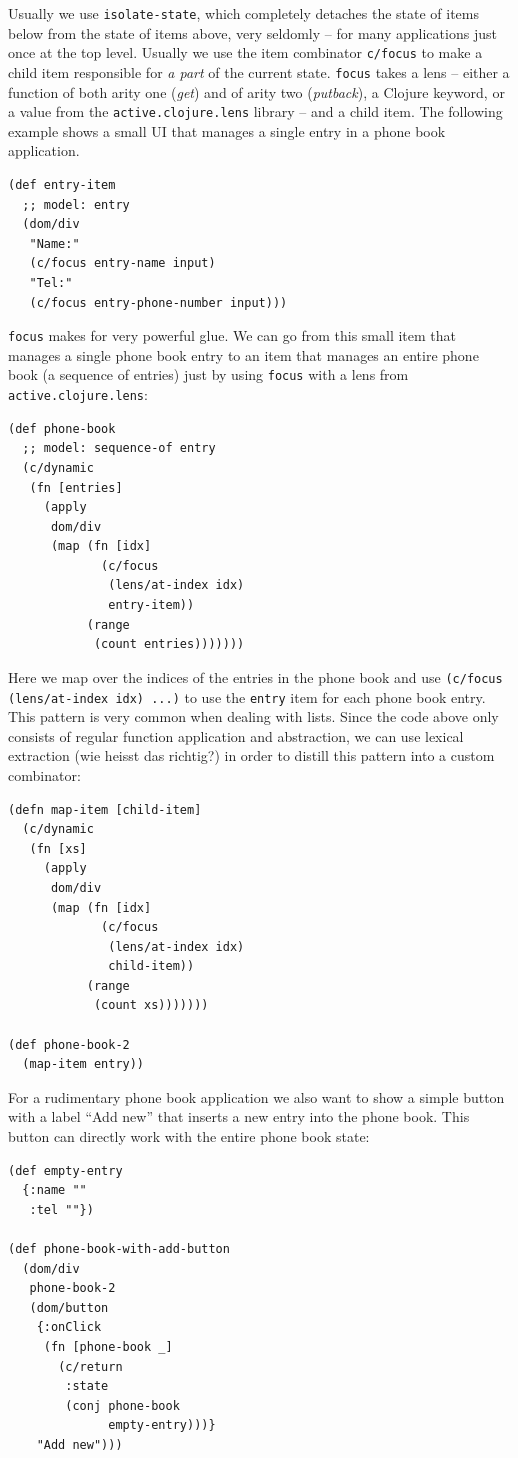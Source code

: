 \documentclass[sigplan,screen]{acmart}
\begin{document}
Usually we use \texttt{isolate-state}, which completely detaches the
state of items below from the state of items above, very seldomly --
for many applications just once at the top level. Usually we use the
item combinator \texttt{c/focus} to make a child item responsible for
\textit{a part} of the current state. \texttt{focus} takes a lens --
either a function of both arity one (\textit{get}) and of arity two
(\textit{putback}), a Clojure keyword, or a value from the
\texttt{active.clojure.lens} library -- and a child item. The
following example shows a small UI that manages a single entry in a
phone book application.
%
\begin{verbatim}
(def entry-item
  ;; model: entry
  (dom/div
   "Name:"
   (c/focus entry-name input)
   "Tel:"
   (c/focus entry-phone-number input)))
\end{verbatim}
%
\texttt{focus} makes for very powerful glue. We can go from this small
item that manages a single phone book entry to an item that manages an
entire phone book (a sequence of entries) just by using \texttt{focus}
with a lens from \texttt{active.clojure.lens}:
%
\begin{verbatim}
(def phone-book
  ;; model: sequence-of entry
  (c/dynamic
   (fn [entries]
     (apply
      dom/div
      (map (fn [idx]
             (c/focus
              (lens/at-index idx)
              entry-item))
           (range
            (count entries)))))))
\end{verbatim}
%
Here we map over the indices of the entries in the phone book and use
\texttt{(c/focus (lens/at-index idx) ...)} to use the \texttt{entry}
item for each phone book entry. This pattern is very common when
dealing with lists. Since the code above only consists of regular
function application and abstraction, we can use lexical extraction
(wie heisst das richtig?) in order to distill this pattern into a
custom combinator:
%
\begin{verbatim}
(defn map-item [child-item]
  (c/dynamic
   (fn [xs]
     (apply
      dom/div
      (map (fn [idx]
             (c/focus
              (lens/at-index idx)
              child-item))
           (range
            (count xs)))))))

(def phone-book-2
  (map-item entry))
\end{verbatim}
%
For a rudimentary phone book application we also want to show a simple
button with a label ``Add new'' that inserts a new entry into the
phone book. This button can directly work with the entire phone book
state:
%
\begin{verbatim}
(def empty-entry
  {:name ""
   :tel ""})

(def phone-book-with-add-button
  (dom/div
   phone-book-2
   (dom/button
    {:onClick
     (fn [phone-book _]
       (c/return
        :state
        (conj phone-book
              empty-entry)))}
    "Add new")))
\end{verbatim}
\end{document}
